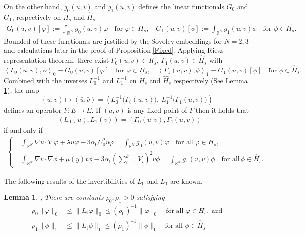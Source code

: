 \documentclass{amsart}
\newtheorem{lemma}[theorem]{Lemma}
\theoremstyle{definition}
\theoremstyle{remark}
\numberwithin{equation}{section}
\begin{document}
On the other hand,  $g_0(u,v)$ and $g_1(u,v)$ {defines the linear functionals {$G_0$ and $G_1$,} respectively on $H_s$ and $\hat{H}_s$} 
\begin{align*}
 G_0(u,v)[\varphi]:=\int_{ \mathbb{R}^N} g_0(u,v)\varphi \quad \text{for $\varphi \in H_s$}, \quad
 G_1(u,v)[\phi]:=\int_{ \mathbb{R}^N} g_1(u,v)\phi \quad \text{for $\phi \in \hat{H}_s$}.
\end{align*}
Bounded of these functionals are justified by the Sovolev embeddings for $N=2, 3$ and  calculations later in the proof of Proposition \ref{Fixed}.
Applying Riesz representation theorem, there exist $\Gamma_0(u,v) \in H_s$, $\Gamma_1(u,v) \in \hat{H}_s$ with
$$\left<\Gamma_0(u,v),\varphi\right>_0 = G_0(u,v)[\varphi] \quad \text{for $\varphi \in H_s$}, \quad \left<\Gamma_1(u,v),\phi\right>_1 = G_1(u,v)[\phi] \quad \text{for $\phi \in \hat{H}_s$}.$$
Combined with the inverses $L_0^{-1}$ and $L_1^{-1}$ on $H_s$ and $\hat{H}_s$ respectively (See Lemma \ref{inv0}), the map
$$(u,v) \mapsto (\bar{u},\bar{v})=\left(L_0^{-1}\Big(\Gamma_0(u,v)\Big), ~L_1^{-1}\Big(\Gamma_1(u,v)\Big)\right)$$
defines an operator $F: E \rightarrow E$. If $(u,v)$ is any fixed point of $F$ then it holds that
\begin{align*}
 &\left(L_0(u),L_1(v)\right) = \left(\Gamma_0(u,v),\Gamma_1(u,v)\right)\end{align*}
 if and only if 
 \begin{align*}
 \left\{ 
 \begin{aligned}
  &\int_{\mathbb{R}^N} \nabla u \cdot \nabla \varphi + \lambda u\varphi - 3\alpha_0U_0^2 u\varphi = \int_{\mathbb{R}^N} g_0(u,v)\varphi \quad\mbox{for all}\  \varphi\in H_s,\\
  &\int_{\mathbb{R}^N} \nabla v \cdot \nabla \phi + \mu(y) v\phi - 3\alpha_1\left(\sum_{i=1}^k V_{i}\right)^2v\phi = \int_{\mathbb{R}^N} g_1(u,v)\phi \quad \mbox{for all}\ \phi \in \hat{H}_s.
 \end{aligned}
 \right.
\end{align*}










The following results of the invertibilities of $L_0$ and $L_1$  are known.
\begin{lemma} \cite{Kwong},  \cite[Lemma 2.1]{wei_yan_2014}  \label{inv0} There are constants $\rho_0, \rho_1>0$ satisfying
\begin{align*}
\rho_0 \|\varphi\|_0 &\le  \|L_0 \varphi\|_0  \le (\rho_0)^{-1}\|\varphi\|_0  \quad \text{for all $\varphi \in H_s$},\ \mbox{and} \\
\rho_1 \|\phi\|_1 &\le  \|L_1 \phi\|_1 \le (\rho_1)^{-1}\|\phi\|_1 \quad \text{for all $\phi \in \hat{H}_s$}
\end{align*}
\end{lemma}
\end{document}
